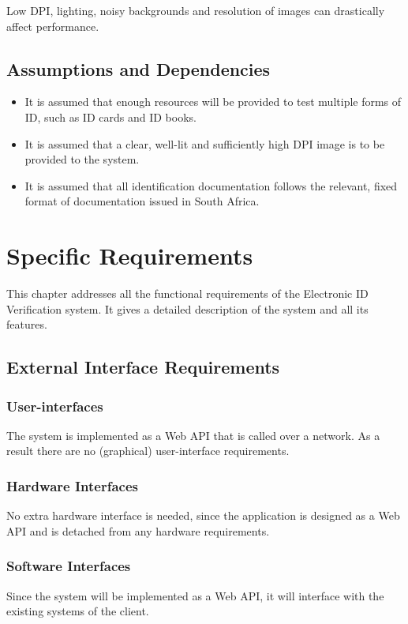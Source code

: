 \documentclass{article}
\def \project{Electronic ID Verification }
\begin{document}
			\noindent Low DPI, lighting, noisy backgrounds and resolution of images can drastically affect performance.

		\subsection{Assumptions and Dependencies}\label{subsec:overall-asusmptions-and-dependencies}
		\begin{itemize}
		    \item It is assumed that enough resources will be provided to test multiple forms of ID, such as ID cards and ID books.
		    \item It is assumed that a clear, well-lit and sufficiently high DPI image is to be provided to the system.
		    \item It is assumed that all identification documentation follows the relevant, fixed format of documentation issued in South Africa.
		\end{itemize}
			

	\cleardoublepage

	\section{Specific Requirements}\label{sec:specific-requirements}
		This chapter addresses all the functional requirements of the \project system. It gives a detailed description of the system and all its features.

		\subsection{External Interface Requirements}\label{subsec:specific-external}
		\subsubsection{User-interfaces}
		The system is implemented as a Web API that is called over a network. As a result there are no (graphical) user-interface requirements.
		\subsubsection{Hardware Interfaces}
		No extra hardware interface is needed, since the application is designed as a Web API and is detached from any hardware requirements.
		\subsubsection{Software Interfaces}
		Since the system will be implemented as a Web API, it will interface with the existing systems of the client.
\end{document}
